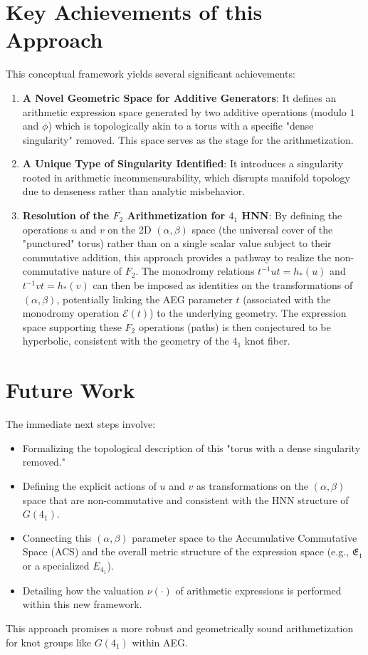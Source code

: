 \documentclass[12pt, a4paper]{article}
\begin{document}
\section{Key Achievements of this Approach}
This conceptual framework yields several significant achievements:
\begin{enumerate}
    \item \textbf{A Novel Geometric Space for Additive Generators}: It defines an arithmetic expression space generated by two additive operations (modulo $1$ and $\phi$) which is topologically akin to a torus with a specific "dense singularity" removed. This space serves as the stage for the arithmetization.
    \item \textbf{A Unique Type of Singularity Identified}: It introduces a singularity rooted in arithmetic incommensurability, which disrupts manifold topology due to denseness rather than analytic misbehavior.
    \item \textbf{Resolution of the $F_2$ Arithmetization for $4_1$ HNN}: By defining the operations $u$ and $v$ on the 2D $(\alpha, \beta)$ space (the universal cover of the "punctured" torus) rather than on a single scalar value subject to their commutative addition, this approach provides a pathway to realize the non-commutative nature of $F_2$. The monodromy relations $t^{-1}ut = h_*(u)$ and $t^{-1}vt = h_*(v)$ can then be imposed as identities on the transformations of $(\alpha, \beta)$, potentially linking the AEG parameter $t$ (associated with the monodromy operation $\mathcal{E}(t)$) to the underlying geometry. The expression space supporting these $F_2$ operations (paths) is then conjectured to be hyperbolic, consistent with the geometry of the $4_1$ knot fiber.
\end{enumerate}

\section{Future Work}
The immediate next steps involve:
\begin{itemize}
    \item Formalizing the topological description of this "torus with a dense singularity removed."
    \item Defining the explicit actions of $u$ and $v$ as transformations on the $(\alpha, \beta)$ space that are non-commutative and consistent with the HNN structure of $G(4_1)$.
    \item Connecting this $(\alpha, \beta)$ parameter space to the Accumulative Commutative Space (ACS) and the overall metric structure of the expression space (e.g., $\mathfrak{E}_1$ or a specialized $E_{4_1}$).
    \item Detailing how the valuation $\nu(\cdot)$ of arithmetic expressions is performed within this new framework.
\end{itemize}
This approach promises a more robust and geometrically sound arithmetization for knot groups like $G(4_1)$ within AEG.
\end{document}
